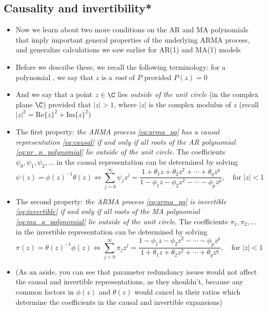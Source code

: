 \documentclass{article}
\begin{document}
\subsection{Causality and invertibility*}

\begin{itemize}
\item Now we learn about two more conditions on the AR and MA polynomials that
  imply important general properties of the underlying ARMA process, and
  generalize calculations we saw earlier for AR(1) and MA(1) models

\item Before we describe these, we recall the following terminology: for a
  polynomial , we say that $z$ is a
  \emph{root} of $P$ provided $P(z) = 0$

\item And we say that a point $z \in \C$ lies \emph{outside of the unit circle} 
  (in the complex plane $\C$) provided that $|z| > 1$, where $|z|$ is the
  complex modulus of $z$ (recall $|z|^2 = \mathrm{Re}\{z\}^2 +
  \mathrm{Im}\{z\}^2$)     

\item The first property: \emph{the ARMA process \eqref{eq:arma_pq} has a causal
    representation \eqref{eq:causal} if and only if all roots of the AR
    polynomial \eqref{eq:ar_p_polynomial} lie outside of the unit circle}. The
  coefficients $\psi_0,\psi_1,\psi_2,\dots$ in the causal representation can be
  determined by solving  
  \[
  \psi(z) = \phi(z)^{-1} \theta(z) \iff 
  \sum_{j=0}^\infty \psi_j z^j = \frac{1 + \theta_1 z + \theta_2 z^2 + \cdots +
    \theta_q z^q}{1 - \phi_1 z - \phi_2 z^2 - \cdots - \phi_p z^p}, \quad
  \text{for $|z| < 1$}
  \]

\item The second property: \emph{the ARMA process \eqref{eq:arma_pq} is
    invertible \eqref{eq:invertible} if and only if all roots of the MA
    polynomial \eqref{eq:ma_q_polynomial} lie outside of the unit circle}. The  
  coefficients $\pi_1,\pi_2,\dots$ in the invertible representation can be 
  determined by solving   
  \[
  \pi(z) = \theta(z)^{-1} \phi(z) \iff 
  \sum_{j=0}^\infty \pi_j z^j = \frac{1 - \phi_1 z - \phi_2 z^2 - \cdots -
    \phi_p z^p}{1 + \theta_1 z + \theta_2 z^2 + \cdots + \theta_q z^q}, \quad 
  \text{for $|z| < 1$}
  \]

\item (As an aside, you can see that parameter redundancy issues would not
  affect the causal and invertible representations, as they shouldn't, because
  any common factors in $\phi(z)$ and $\theta(z)$ would cancel in their ratios 
  which determine the coefficients in the causal and invertible expansions)  


\end{itemize}
\end{document}
